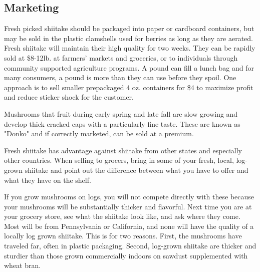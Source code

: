 \documentclass{tufte-handout}
\begin{document}
\subsection{Marketing}

Fresh picked shiitake should be packaged into paper or cardboard containers, but may be sold in the plastic clamshells used for berries as long as they are aerated. 
Fresh shiitake will maintain their high quality for two weeks. 
They can be rapidly sold at \$8-12\/lb. at farmers' markets and groceries, or to individuals through community supported agriculture programs. 
A pound can fill a lunch bag and for many consumers, a pound is more than they can use before they spoil. 
One approach is to sell smaller prepackaged 4 oz. containers for \$4 to maximize profit and reduce sticker shock for the customer.

Mushrooms that fruit during early spring and late fall are slow growing and develop thick cracked caps with a particularly fine taste. 
These are known as "Donko" and if correctly marketed, can be sold at a premium. 

Fresh shiitake has advantage against shiitake from other states and especially other countries. When selling to grocers, bring in some of your fresh, local, log-grown shiitake and point out the difference between what you have to offer and what they have on the shelf. 


If you grow mushrooms on logs, you will not compete directly with these because your mushrooms will be substantially thicker and flavorful.
Next time you are at your grocery store, see what the shiitake look like, and ask where they come. 
Most will be from Pennsylvania or California, and none will have the quality of a locally log grown shiitake. 
This is for two reasons. 
First, the mushrooms have traveled far, often in plastic packaging. 
Second, log-grown shiitake are thicker and sturdier than those grown commercially indoors on sawdust supplemented with wheat bran.


\end{document}
